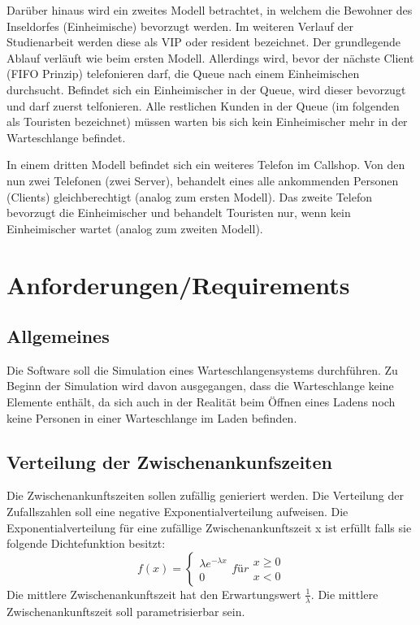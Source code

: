 Darüber hinaus wird ein zweites Modell betrachtet, in welchem die Bewohner des Inseldorfes (Einheimische) bevorzugt werden. Im weiteren Verlauf der Studienarbeit werden diese als VIP oder resident bezeichnet. Der grundlegende Ablauf verläuft wie beim ersten Modell. Allerdings wird, bevor der nächste Client (FIFO Prinzip) telefonieren darf, die Queue nach einem Einheimischen durchsucht. Befindet sich ein Einheimischer in der Queue, wird dieser bevorzugt und darf zuerst telfonieren. Alle restlichen Kunden in der Queue (im folgenden als Touristen bezeichnet) müssen warten bis sich kein Einheimischer mehr in der Warteschlange befindet.

In einem dritten Modell befindet sich ein weiteres Telefon im Callshop. Von den nun zwei Telefonen (zwei Server), behandelt eines alle ankommenden Personen (Clients) gleichberechtigt (analog zum ersten Modell). Das zweite Telefon bevorzugt die Einheimischer und behandelt Touristen nur, wenn kein Einheimischer wartet (analog zum zweiten Modell).

\section{Anforderungen/Requirements}
\label{requirements}
\subsection{Allgemeines}
Die Software soll die Simulation eines Warteschlangensystems durchführen. Zu Beginn der Simulation wird davon ausgegangen, dass die Warteschlange keine Elemente enthält, da sich auch in der Realität beim Öffnen eines Ladens noch keine Personen in einer Warteschlange im Laden befinden.
\subsection{Verteilung der Zwischenankunfszeiten}
Die Zwischenankunftszeiten sollen zufällig genieriert werden. Die Verteilung der Zufallszahlen soll eine negative Exponentialverteilung aufweisen. Die Exponentialverteilung für eine zufällige Zwischenankunftszeit x ist erfüllt falls sie folgende Dichtefunktion besitzt:
$$
f(x) = \left\{\begin{matrix}
\lambda e^{-\lambda x}
\\
0
\end{matrix}\right.für \begin{matrix}
x \geqslant 0
\\
x < 0
\end{matrix}
$$
Die mittlere Zwischenankunftszeit hat den Erwartungswert $\frac{1}{\lambda}$. Die mittlere Zwischenankunftszeit soll parametrisierbar sein.
